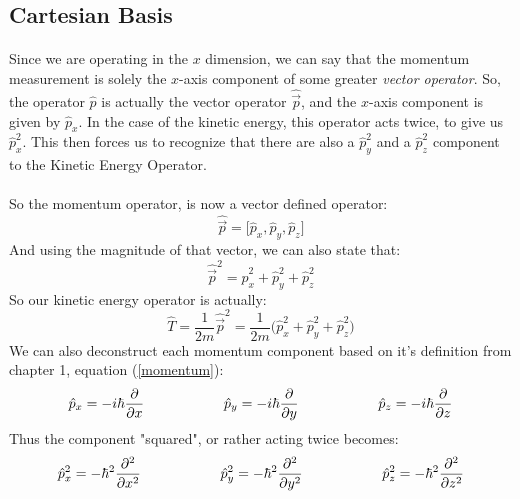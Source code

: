 \documentclass[12pt,letterpaper]{book}
\begin{document}
\subsection*{Cartesian Basis}

\paragraph*{}Since we are operating in the $x$ dimension, we can say that the momentum measurement is solely the $x$-axis component of some greater \textit{vector operator}. So, the operator $\hat{p}$ is actually the vector operator $\hat{\vec{p}}$, and the $x$-axis component is given by $\hat{p}_x$. In the case of the kinetic energy, this operator acts twice, to give us $\hat{p}_x^2$. This then forces us to recognize that there are also a $\hat{p}_y^2$ and a $\hat{p}_z^2$ component to the Kinetic Energy Operator.
\paragraph*{}So the momentum operator, is now a vector defined operator:
\begin{equation}
\hat{\vec{p}} = \big[ \hat{p}_x , \hat{p}_y , \hat{p}_z \big]
\end{equation} 
And using the magnitude of that vector, we can also state that:
\begin{equation}
\hat{\vec{p}}^2 = \hat{p}_x^2 + \hat{p}_y^2 + \hat{p}_z^2 
\end{equation}
So our kinetic energy operator is actually:
\begin{equation}
\label{3D Cartesian Kinetic}
\hat{T} = \frac{1}{2m}\hat{\vec{p}}^2 = 
\frac{1}{2m}\big( \hat{p}_x^2 + \hat{p}_y^2 + \hat{p}_z^2 \big)
\end{equation}
We can also deconstruct each momentum component based on it's definition from chapter 1, equation (\ref{momentum}):
\begin{equation}
\label{momentum cartesian}
\hat{p}_x = -i\hbar \frac{\partial}{\partial x} \text{\hspace*{2cm}}
\hat{p}_y = -i\hbar \frac{\partial}{\partial y} \text{\hspace*{2cm}}
\hat{p}_z = -i\hbar \frac{\partial}{\partial z}
\end{equation}
Thus the component "squared", or rather acting twice becomes:
\begin{equation}
\label{momentum sq cartesian}
\hat{p}_x^2 = -\hbar^2 \frac{\partial^2}{\partial x^2} \text{\hspace*{2cm}}
\hat{p}_y^2 = -\hbar^2 \frac{\partial^2}{\partial y^2} \text{\hspace*{2cm}}
\hat{p}_z^2 = -\hbar^2 \frac{\partial^2}{\partial z^2}
\end{equation}
\end{document}
